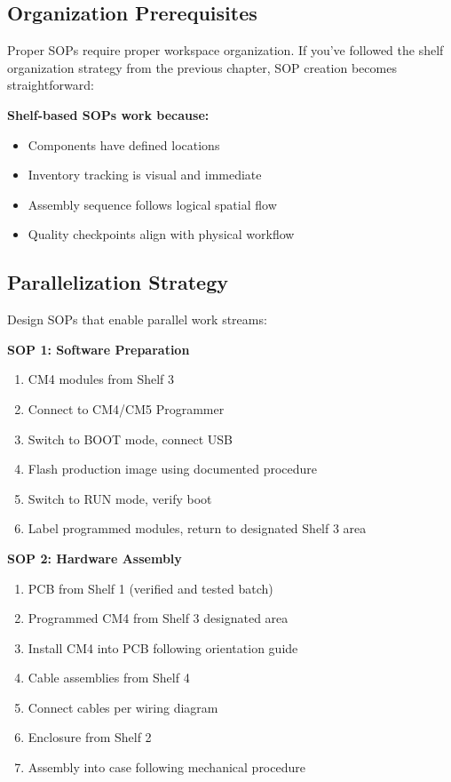 \subsection{Organization Prerequisites}

Proper SOPs require proper workspace organization. If you've followed the shelf organization strategy from the previous chapter, SOP creation becomes straightforward:

\textbf{Shelf-based SOPs work because:}
\begin{itemize}
\item Components have defined locations
\item Inventory tracking is visual and immediate
\item Assembly sequence follows logical spatial flow
\item Quality checkpoints align with physical workflow
\end{itemize}

\subsection{Parallelization Strategy}

Design SOPs that enable parallel work streams:

\textbf{SOP 1: Software Preparation}
\begin{enumerate}
\item CM4 modules from Shelf 3
\item Connect to CM4/CM5 Programmer
\item Switch to BOOT mode, connect USB
\item Flash production image using documented procedure
\item Switch to RUN mode, verify boot
\item Label programmed modules, return to designated Shelf 3 area
\end{enumerate}

\textbf{SOP 2: Hardware Assembly}
\begin{enumerate}
\item PCB from Shelf 1 (verified and tested batch)
\item Programmed CM4 from Shelf 3 designated area
\item Install CM4 into PCB following orientation guide
\item Cable assemblies from Shelf 4
\item Connect cables per wiring diagram
\item Enclosure from Shelf 2
\item Assembly into case following mechanical procedure
\end{enumerate}

